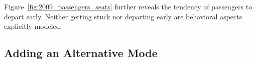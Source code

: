 Figure~\ref{fig:2009_passengers_seats} further reveals the tendency of passengers to depart early. 
Neither getting stuck nor departing early are behavioral aspects explicitly modeled.  





\subsection{Adding an Alternative Mode}


